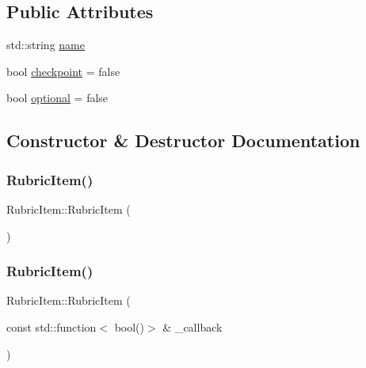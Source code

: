 \subsection*{Public Attributes}
\begin{DoxyCompactItemize}
\item 
std\+::string \hyperlink{class_rubric_item_accc3649acf6ae1bb543b56d826a3d01f}{name}
\item 
bool \hyperlink{class_rubric_item_a0f240be9e7b0dc6853b3e2b0df5713b8}{checkpoint} = false
\item 
bool \hyperlink{class_rubric_item_aebc5a7d15f0c2f5addc66fdb854693c0}{optional} = false
\end{DoxyCompactItemize}


\subsection{Constructor \& Destructor Documentation}
\hypertarget{class_rubric_item_a0fac66f38c2f2a1712690c3728b1a63d}{}\label{class_rubric_item_a0fac66f38c2f2a1712690c3728b1a63d} 
\subsubsection{\texorpdfstring{Rubric\+Item()}{RubricItem()}\hspace{0.1cm}{\footnotesize\ttfamily [1/4]}}
{\footnotesize\ttfamily Rubric\+Item\+::\+Rubric\+Item (\begin{DoxyParamCaption}{ }\end{DoxyParamCaption})\hspace{0.3cm}{\ttfamily [default]}}

\hypertarget{class_rubric_item_a9ab3ef65052c84f8fb59764429e67980}{}\label{class_rubric_item_a9ab3ef65052c84f8fb59764429e67980} 
\subsubsection{\texorpdfstring{Rubric\+Item()}{RubricItem()}\hspace{0.1cm}{\footnotesize\ttfamily [2/4]}}
{\footnotesize\ttfamily Rubric\+Item\+::\+Rubric\+Item (\begin{DoxyParamCaption}\item[{const std\+::function$<$ bool()$>$ \&}]{\+\_\+callback }\end{DoxyParamCaption})\hspace{0.3cm}{\ttfamily [inline]}}

